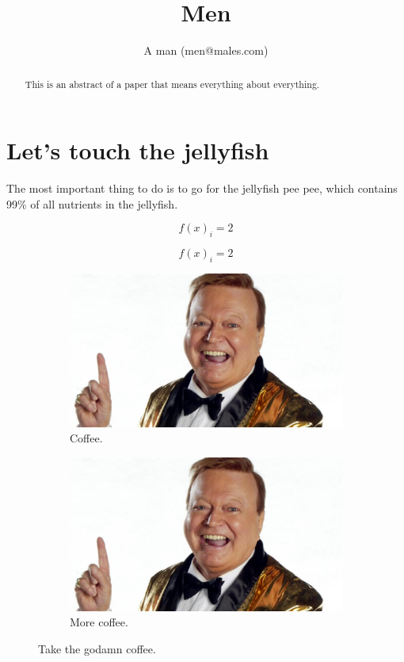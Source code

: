 \documentclass[]{article}
\title{Men}
\author{A man (men@males.com)}
\begin{document}
\maketitle

\begin{abstract}
This is an abstract of a paper that means everything about everything.
\end{abstract}

\tableofcontents
\newpage

\section{Let's touch the jellyfish}
The most important thing to do is to go for the jellyfish pee pee, which contains 99\% of all nutrients in the jellyfish.

\begin{equation}
f(x)_{i} = 2
\end{equation}

\begin{equation*}
f(x)_{i} = 2
\end{equation*}
\begin{figure}[h!]
	\centering
	\begin{subfigure}[b]{0.4\linewidth}
		\includegraphics[width=\linewidth]{ims/bert2.jpg}
		\caption{Coffee.}
	\end{subfigure}
	\begin{subfigure}[b]{0.4\linewidth}
		\includegraphics[width=\linewidth]{ims/bert2.jpg}
		\caption{More coffee.}
	\end{subfigure}
	\caption{Take the godamn coffee.}
	\label{fig:coffee}
\end{figure}
\end{document}

